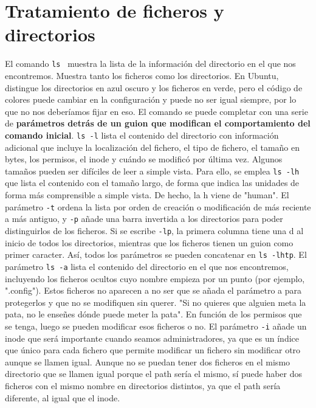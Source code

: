 \section{Tratamiento de ficheros y directorios}
El comando \texttt{ls} \marginpar[\footnotesize ls]  \  muestra la lista de la información del directorio en el que nos encontremos. Muestra tanto los ficheros como los directorios. En Ubuntu, distingue los directorios en azul oscuro y los ficheros en verde, pero el código de colores puede cambiar en la configuración y puede no ser igual siempre, por lo que no nos deberíamos fijar en eso.  El comando se puede completar con una serie de \textbf{parámetros detrás de un guion que modifican el comportamiento del comando inicial}. \texttt{ls -l} lista el contenido del directorio con información adicional que incluye la localización del fichero, el tipo de fichero, el tamaño en bytes, los permisos, el inode y cuándo se modificó por última vez. Algunos tamaños pueden ser difíciles de leer a simple vista. Para ello, se emplea \texttt{ls -lh} que lista el contenido con el tamaño largo, de forma que indica las unidades de forma más comprensible a simple vista. De hecho, la h viene de "human".  El parámetro \texttt{-t} ordena la lista por orden de creación o modificación de más reciente a más antiguo, y \texttt{-p} añade una barra invertida a los directorios para poder distinguirlos de los ficheros. Si se escribe \texttt{-lp}, la primera columna tiene una d al inicio de todos los directorios, mientras que los ficheros tienen un guion como primer caracter. Así, todos los parámetros se pueden concatenar en \texttt{ls -lhtp}. El parámetro \texttt{ls -a} lista el contenido del directorio en el que nos encontremos, incluyendo los ficheros ocultos cuyo nombre empieza por un punto (por ejemplo, ".config"). Estos ficheros no aparecen a no ser que se añada el parámetro a para protegerlos y que no se modifiquen sin querer. "Si no quieres que alguien meta la pata, no le enseñes dónde puede meter la pata". En función de los permisos que se tenga, luego se pueden modificar esos ficheros o no. El parámetro \texttt{-i} añade un inode que será importante cuando seamos administradores, ya que es un índice que único para cada fichero que permite modificar un fichero sin modificar otro aunque se llamen igual. Aunque no se puedan tener dos ficheros en el mismo directorio que se llamen igual porque el path sería el mismo, sí puede haber dos ficheros con el mismo nombre en directorios distintos, ya que el path sería diferente, al igual que el inode.

